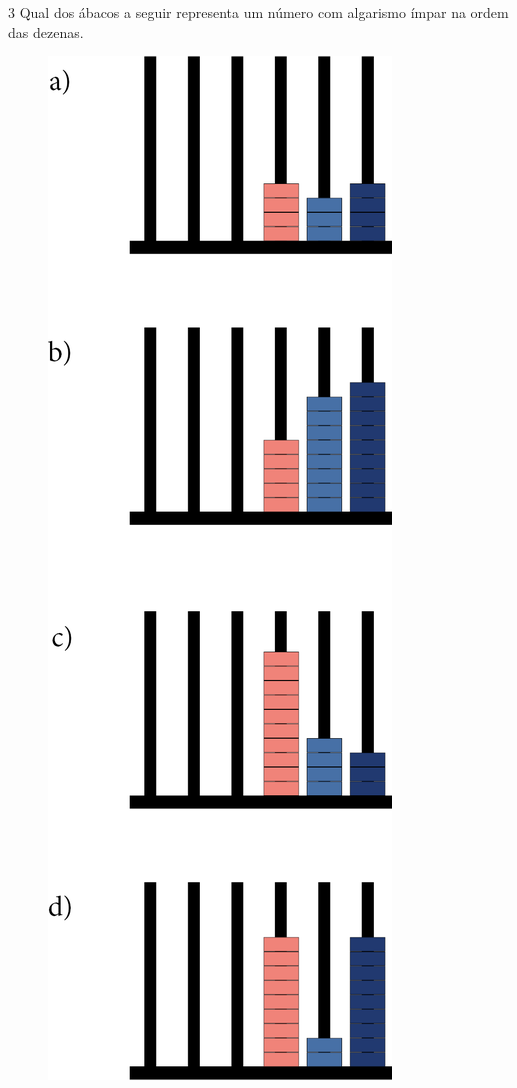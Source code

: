\pagebreak
\num{3} Qual dos ábacos a seguir representa um número com algarismo ímpar na ordem
das dezenas.

\begin{figure}[htpb!]
\includegraphics[scale=1]{./media/image16.png}
\end{figure}

